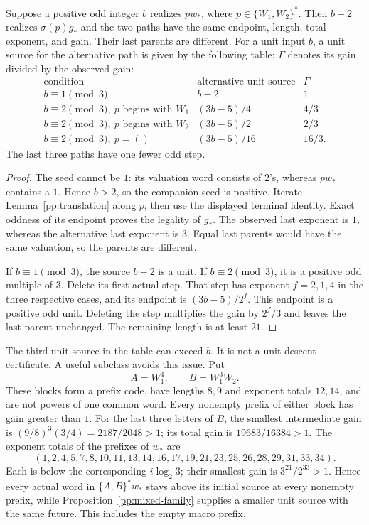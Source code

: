 \begin{proposition}\label{pp:mixed-family}
Suppose a positive odd integer $b$ realizes $p w_*$, where
$p\in\{W_1,W_2\}^*$. Then $b-2$ realizes $\sigma(p)g_*$ and the
two paths have the same endpoint, length, total exponent, and gain.
Their last parents are different. For a unit input $b$, a unit source
for the alternative path is given by the following table; $\Gamma$
denotes its gain divided by the observed gain:
\[
\begin{array}{c|c|c}
\text{condition}&\text{alternative unit source}&\Gamma\\ \hline
b\equiv1\pmod3&b-2&1\\
b\equiv2\pmod3,\ p\text{ begins with }W_1&(3b-5)/4&4/3\\
b\equiv2\pmod3,\ p\text{ begins with }W_2&(3b-5)/2&2/3\\
b\equiv2\pmod3,\ p=()&(3b-5)/16&16/3.
\end{array}
\]
The last three paths have one fewer odd step.
\end{proposition}
\begin{proof}
The seed cannot be $1$: its valuation word consists of $2$'s, whereas
$p w_*$ contains a $1$. Hence $b>2$, so the companion seed is positive.
Iterate Lemma~\ref{pp:translation} along $p$, then use the displayed
terminal identity. Exact oddness of its endpoint proves the legality
of $g_*$. The observed last exponent is $1$, whereas the alternative
last exponent is $3$. Equal last parents would have the same valuation,
so the parents are different.

If $b\equiv1\pmod3$, the source $b-2$ is a unit. If
$b\equiv2\pmod3$, it is a positive odd multiple of $3$.
Delete its first actual step. That step has exponent $f=2,1,4$
in the three respective cases, and its endpoint is
$(3b-5)/2^f$. This endpoint is a positive odd unit. Deleting the
step multiplies the gain by $2^f/3$ and leaves the last parent
unchanged. The remaining length is at least $21$.
\end{proof}

The third unit source in the table can exceed $b$. It is not a
unit descent certificate. A useful subclass avoids this issue. Put
\[
 A=W_1^4,\qquad B=W_1^3 W_2.
\]
These blocks form a prefix code, have lengths $8,9$ and exponent totals
$12,14$, and are not powers of one common word. Every nonempty prefix
of either block has gain greater than $1$. For the last three letters
of $B$, the smallest intermediate gain is
$(9/8)^3(3/4)=2187/2048>1$; its total gain is $19683/16384>1$.
The exponent totals of the prefixes of $w_*$ are
\[
 (1,2,4,5,7,8,10,11,13,14,16,17,19,21,23,25,26,28,29,31,33,34).
\]
Each is below the corresponding $i\log_2 3$; their smallest gain is
$3^{21}/2^{33}>1$. Hence every actual word in
$\{A,B\}^*w_*$ stays above its initial source at every nonempty
prefix, while Proposition~\ref{pp:mixed-family} supplies a smaller
unit source with the same future. This includes the empty macro prefix.

